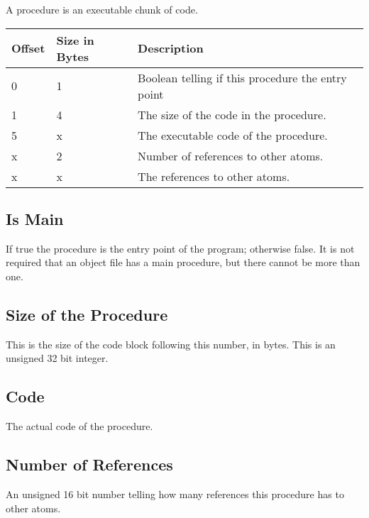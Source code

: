 A procedure is an executable chunk of code.

\begin{table}[h]
    \centering
    \label{tbl:procedure}
    \begin{tabular}{|l|l|l|}
        \hline
        \textbf{Offset} & \textbf{Size in Bytes} & \textbf{Description}                              \\ \hline
        0               & 1                      & Boolean telling if this procedure the entry point \\ \hline
        1               & 4                      & The size of the code in the procedure.            \\ \hline
        5               & x                      & The executable code of the procedure.             \\ \hline
        x               & 2                      & Number of references to other atoms.              \\ \hline
        x               & x                      & The references to other atoms.                    \\ \hline
    \end{tabular}
\end{table}

\subsection{Is Main}
If true the procedure is the entry point of the program; otherwise false. It is 
not required that an object file has a main procedure, but there cannot be more 
than one.

\subsection{Size of the Procedure}
This is the size of the code block following this number, in bytes. This is an
unsigned 32 bit integer.

\subsection{Code}
The actual code of the procedure.

\subsection{Number of References}
An unsigned 16 bit number telling how many references this procedure has to 
other atoms.

